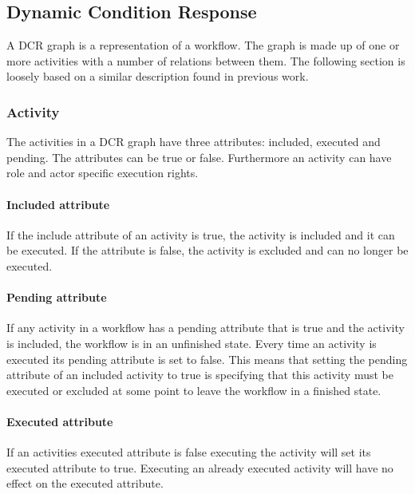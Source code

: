 \documentclass{article}
\begin{document}
		\subsection{Dynamic Condition Response}

		A DCR graph is a representation of a workflow.
		The graph is made up of one or more activities with a number of relations between them. 
		The following section is loosely based on a similar description found in previous work\cite{dcreum}.

		\subsubsection{Activity}

		The activities in a DCR graph have three attributes: included, executed and pending. 
		The attributes can be true or false. 
		Furthermore an activity can have role and actor specific execution rights.

			\paragraph{Included attribute}

			If the include attribute of an activity is true, the activity is included and it can be executed. 
			If the attribute is false, the activity is excluded and can no longer be executed.

			\paragraph{Pending attribute}

			If any activity in a workflow has a pending attribute that is true and the activity is included, the workflow is in an unfinished state.
			Every time an activity is executed its pending attribute is set to false.
			This means that setting the pending attribute of an included activity to true is specifying that this activity must be executed or excluded at some point to leave the workflow in a finished state.

			\paragraph{Executed attribute}

			If an activities executed attribute is false executing the activity will set its executed attribute to true.
			Executing an already executed activity will have no effect on the executed attribute.
\end{document}
